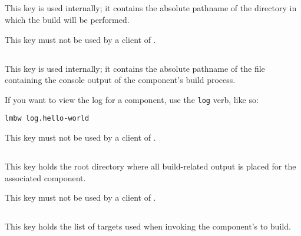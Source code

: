 
\subsection{}\label{variables:build-directory}

This key is used internally; it contains the absolute pathname of the
directory in which the build will be performed.

This key must not be used by a client of \lmsbw.


\subsection{}\label{variables:build-log}

This key is used internally; it contains the absolute pathname of the
file containing the console output of the component's build process.

If you want to view the log for a component, use the \texttt{log}
verb, like so:

\begin{verbatim}
lmbw log.hello-world
\end{verbatim}

This key must not be used by a client of \lmsbw.


\subsection{}\label{variables:build-root-directory}

This key holds the root directory where all build-related output is
placed for the associated component.

This key must not be used by a client of \lmsbw.


\subsection{}\label{variables:build-target}

This key holds the list of targets used when invoking the component's
\makefile to build.

